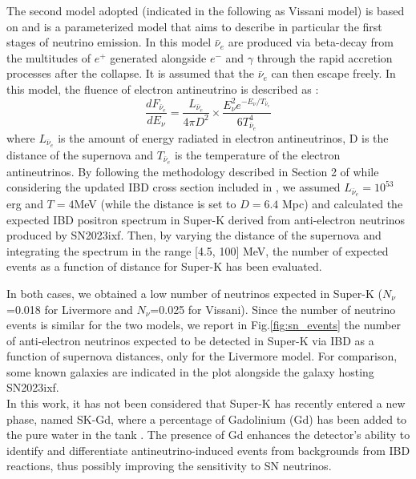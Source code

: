 \documentclass[twocolumn]{aastex631}
\begin{document}
The second model adopted (indicated in the following as Vissani model) is based on \cite{art:Vissanimodel} and is a parameterized model that aims to describe in particular the first stages of neutrino emission. In this model $\bar{\nu}_e$ are produced via beta-decay from the multitudes of $e^+$ generated alongside $e^-$ and $\gamma$ through the rapid accretion processes after the collapse. It is assumed that the $\bar{\nu}_e$ can then escape freely. 
In this model, the fluence of electron antineutrino is described as \citep{art:Vissani2015}: 
\begin{equation}
    \dfrac{dF_{\bar{\nu}_e}}{dE_{\nu}} = \dfrac{L_{\bar{\nu}_e}}{4\pi D^2}\times \dfrac{E_{\nu}^2 e^{-E_{\nu}/T_{\bar{\nu}_e}}}{6T_{\bar{\nu}_e}^4}
\end{equation}
where $L_{\bar{\nu}_e}$ is the  amount of energy radiated in electron antineutrinos, D is the distance of the supernova and $T_{\bar{\nu}_e}$ is the temperature of the electron antineutrinos.
By following the methodology described in Section 2 of \cite{art:Vissani2015} while considering the updated IBD cross section included in \cite{art:vissani2022},  we assumed $L_{\bar{\nu}_e}=10^{53}$ erg and $T=4$MeV (while the distance is set to $D=6.4$ Mpc) and calculated the expected IBD positron spectrum in Super-K derived from anti-electron neutrinos produced by SN2023ixf. Then, by varying the distance of the supernova and integrating the spectrum in the range [4.5, 100] MeV, the number of expected events as a function of distance for Super-K has been evaluated. 

In both cases, we obtained a low number of neutrinos expected in Super-K ($N_{\nu}$=0.018 for Livermore and $N_{\nu}$=0.025 for Vissani).
Since the number of neutrino events is  similar for the two models, we report in Fig.\ref{fig:sn_events} the number of anti-electron neutrinos expected to be detected in Super-K via IBD as a function of supernova distances, only for the Livermore model. For comparison, some known galaxies are indicated in the plot alongside the galaxy hosting SN2023ixf.  \\
In this work, it has not been considered that Super-K has recently entered a new phase, named SK-Gd, where a percentage of Gadolinium (Gd) has been added to the pure water in the tank \citep{art:sk-gd}. The presence of Gd enhances the detector’s ability to identify and differentiate antineutrino-induced events from backgrounds from IBD reactions, thus possibly improving the sensitivity to SN neutrinos.
\smallskip
\end{document}
